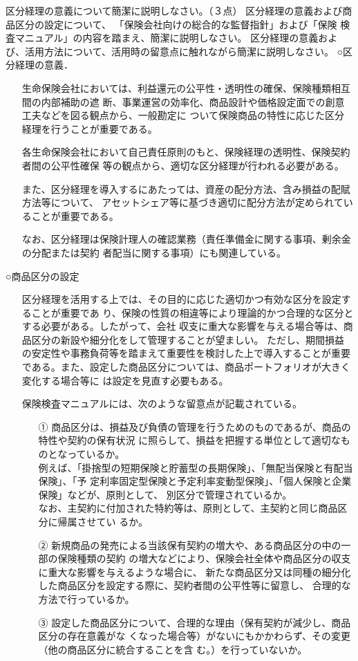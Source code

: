 \documentclass[report,gutter=10mm,fore-edge=10mm,uplatex,dvipdfmx]{jlreq}
\begin{document}
区分経理の意義について簡潔に説明しなさい。（３点）
区分経理の意義および商品区分の設定について、
「保険会社向けの総合的な監督指針」および「保険
検査マニュアル」の内容を踏まえ、簡潔に説明しなさい。
区分経理の意義および、活用方法について、活用時の留意点に触れながら簡潔に説明しなさい。
\answer{}
\noindent ○区分経理の意義．
\begin{itemize}
\item[] 生命保険会社においては、利益還元の公平性・透明性の確保、保険種類相互間の内部補助の遮
 断、事業運営の効率化、商品設計や価格設定面での創意工夫などを図る観点から、一般勘定に
 ついて保険商品の特性に応じた区分経理を行うことが重要である。
\item[] 各生命保険会社において自己責任原則のもと、保険経理の透明性、保険契約者間の公平性確保
 等の観点から、適切な区分経理が行われる必要がある。
\item[] また、区分経理を導入するにあたっては、資産の配分方法、含み損益の配賦方法等について、
 アセットシェア等に基づき適切に配分方法が定められていることが重要である。
\item[] なお、区分経理は保険計理人の確認業務（責任準備金に関する事項、剰余金の分配または契約
 者配当に関する事項）にも関連している。
\end{itemize}
\noindent ○商品区分の設定
\begin{itemize}
\item[] 区分経理を活用する上では、その目的に応じた適切かつ有効な区分を設定することが重要であ
 り、保険の性質の相違等により理論的かつ合理的な区分とする必要がある。したがって、会社
 収支に重大な影響を与える場合等は、商品区分の新設や細分化をして管理することが望ましい。
 ただし、期間損益の安定性や事務負荷等を踏まえて重要性を検討した上で導入することが重要
 である。また、設定した商品区分については、商品ポートフォリオが大きく変化する場合等に
 は設定を見直す必要もある。
\item[] 保険検査マニュアルには、次のような留意点が記載されている。
\begin{itemize}
\item[①] 商品区分は、損益及び負債の管理を行うためのものであるが、商品の特性や契約の保有状況
に照らして、損益を把握する単位として適切なものとなっているか。\\
 例えば、「掛捨型の短期保険と貯蓄型の長期保険」、「無配当保険と有配当保険」、「予
 定利率固定型保険と予定利率変動型保険」、「個人保険と企業保険」などが、原則として、
 別区分で管理されているか。\\
 なお、主契約に付加された特約等は、原則として、主契約と同じ商品区分に帰属させてい
 るか。
\item[②] 新規商品の発売による当該保有契約の増大や、ある商品区分の中の一部の保険種類の契約
 の増大などにより、保険会社全体や商品区分の収支に重大な影響を与えるような場合に、
 新たな商品区分又は同種の細分化した商品区分を設定する際に、契約者間の公平性等に留意し、
合理的な方法で行っているか。
\item[③] 設定した商品区分について、合理的な理由（保有契約が減少し、商品区分の存在意義がな
 くなった場合等）がないにもかかわらず、その変更（他の商品区分に統合することを含
 む。）を行っていないか。
\end{itemize}
\end{itemize}
\end{document}
